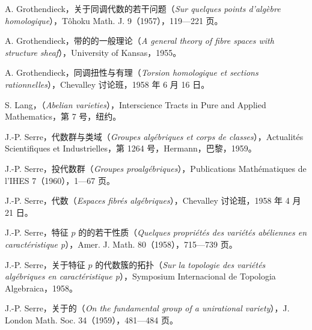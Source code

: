 \begin{enumerate}[label={[\arabic*]},leftmargin=2em]
\item A. Grothendieck，关于同调代数的若干问题（\textit{Sur quelques points d'algèbre homologique}），Tôhoku Math. J. 9（1957），119—221 页。
\item A. Grothendieck，带的的一般理论（\textit{A general theory of fibre spaces with structure sheaf}），University of Kansas，1955。
\item A. Grothendieck，同调扭性与有理（\textit{Torsion homologique et sections rationnelles}），Chevalley 讨论班，1958 年 6 月 16 日。
\item S. Lang，（\textit{Abelian varieties}），Interscience Tracts in Pure and Applied Mathematics，第 7 号，纽约。
\item J.-P. Serre，代数群与类域（\textit{Groupes algébriques et corps de classes}），Actualités Scientifiques et Industrielles，第 1264 号，Hermann，巴黎，1959。
\item J.-P. Serre，投代数群（\textit{Groupes proalgébriques}），Publications Mathématiques de l'IHES 7（1960），1—67 页。
\item J.-P. Serre，代数（\textit{Espaces fibrés algébriques}），Chevalley 讨论班，1958 年 4 月 21 日。
\item J.-P. Serre，特征 $p$ 的的若干性质（\textit{Quelques propriétés des variétés abéliennes en caractéristique p}），Amer. J. Math. 80（1958），715—739 页。
\item J.-P. Serre，关于特征 $p$ 的代数簇的拓扑（\textit{Sur la topologie des variétés algébriques en caractéristique p}），Symposium Internacional de Topologia Algebraica，1958。
\item J.-P. Serre，关于的（\textit{On the fundamental group of a unirational variety}），J. London Math. Soc. 34（1959），481—484 页。
\end{enumerate}
